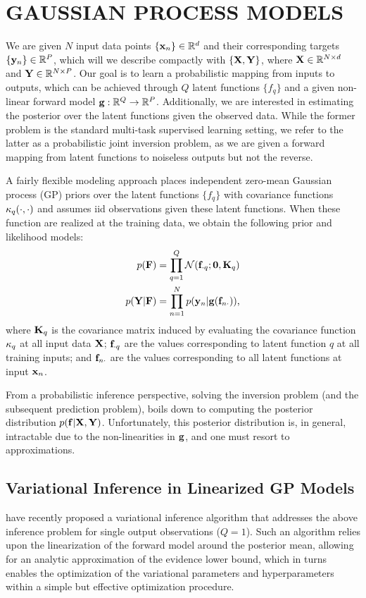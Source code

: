 \section{GAUSSIAN PROCESS MODELS}
We are given $N$ input data points $ \{ \mathbf{x}_n  \} \in \mathbb{R}^{d}$ and their corresponding  
targets $\{ \mathbf{y}_n  \} \in \mathbb{R}^{P}$, which will  we describe compactly with $\left\{{\mathbf{X}, \mathbf{Y}}\right\}$,
where $\mathbf{X} \in \mathbb{R}^{N \times d}$  and $\mathbf{Y} \in \mathbb{R}^{N \times P}$. Our goal is 
to learn a probabilistic mapping from inputs to outputs, which can be achieved through $Q$ latent  functions $\{ f_q \}$ and a given non-linear forward model $\mathbf{g} : \mathbb{R}^{Q} \to \mathbb{R}^{P}$. Additionally, we are interested in estimating the posterior over the latent functions given the observed data. 
While the former problem  is the standard multi-task supervised learning setting, we refer 
to the latter  as a probabilistic joint inversion problem, as we are given a forward mapping from 
latent functions to noiseless outputs but not the reverse. 

A fairly flexible modeling approach places independent zero-mean Gaussian process (GP) priors over 
the latent functions $\{ f_q \}$ with covariance functions $\kappa_q(\cdot, \cdot)$ and assumes iid observations given these latent functions. When these function are realized at the training data,
we obtain the following prior and likelihood models:
\begin{align}
	\label{eq:gp-model-1}
	p(\mathbf{F})  &=  \prod_{q=1}^{Q} \mathcal{N}(\mathbf{f}_{\cdot q}; \mathbf{0}, \mathbf{K}_q) \\
	\label{eq:gp-model-2}	
	p(\mathbf{Y} | \mathbf{F}) &= \prod_{n=1}^N p(\mathbf{y}_n | \mathbf{g} ( \mathbf{f}_{n \cdot} )) \text{,}
\end{align}
where $\mathbf{K}_q$ is the covariance matrix induced by evaluating  the covariance 
function $\kappa_q$ at all input data $\mathbf{X}$; $\mathbf{f}_{\cdot q}$ are  the values 
corresponding to latent function $q$ at all training inputs; 
and $\mathbf{f}_{n \cdot}$ are  the values corresponding to all latent functions at input $\mathbf{x}_n$. 

From a probabilistic inference perspective, solving the inversion problem (and the 
subsequent prediction problem), boils down to computing the posterior distribution 
$p(\mathbf{f} | \mathbf{X}, \mathbf{Y})$. Unfortunately, this posterior distribution is, in general, 
intractable due to the non-linearities in $\mathbf{g}$, and one must resort to approximations.
%
\subsection{Variational Inference in Linearized GP Models}
\citet{steinberg-bonilla-nips-2014} have recently proposed a variational inference algorithm that
addresses the above inference problem for single output observations ($Q=1$).  
Such an algorithm relies upon the linearization of the forward model around the posterior 
mean, allowing for an analytic approximation of the evidence lower bound, which in turns 
enables the optimization of the variational parameters and hyperparameters within a simple 
but effective optimization procedure.  


